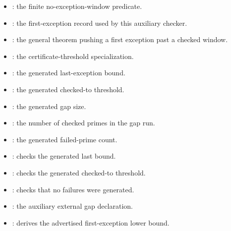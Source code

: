 \begin{filelist}
  \begin{itemize}[leftmargin=1.5em,itemsep=0.15em]
    \item {}: the finite no-exception-window predicate.
    \item {}: the first-exception record used by this auxiliary checker.
    \item {}: the general theorem pushing a first exception past a checked window.
    \item {}: the certificate-threshold specialization.
  \end{itemize}

  \begin{itemize}[leftmargin=1.5em,itemsep=0.15em]
    \item {}: the generated last-exception bound.
    \item {}: the generated checked-to threshold.
    \item {}: the generated gap size.
    \item {}: the number of checked primes in the gap run.
    \item {}: the generated failed-prime count.
    \item {}: checks the generated last bound.
    \item {}: checks the generated checked-to threshold.
    \item {}: checks that no failures were generated.
    \item {}: the auxiliary external gap declaration.
    \item {}: derives the advertised first-exception lower bound.
  \end{itemize}
\end{filelist}

